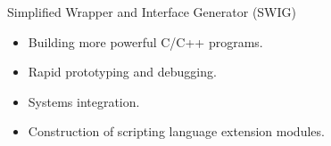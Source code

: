 \begin{frame}{Simplified Wrapper and Interface Generator (SWIG)}
\begin{itemize}
\item Building more powerful C/C++ programs. %
\item Rapid prototyping and debugging.%
\item Systems integration. %
\item Construction of scripting language extension modules. %
\end{itemize}
\end{frame}

